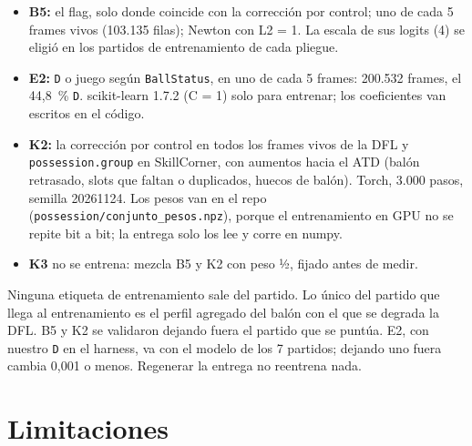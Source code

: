 \documentclass[10pt,a4paper]{article}
\newcommand{\code}[1]{\texttt{\textcolor{codigo}{#1}}}
\begin{document}
\begin{itemize}
  \item \textbf{B5:} el flag, solo donde coincide con la corrección por control; uno de cada 5 frames vivos (103.135 filas); Newton con L2 = 1. La escala de sus logits (4) se eligió en los partidos de entrenamiento de cada pliegue.
  \item \textbf{E2:} \code{D} o juego según \code{BallStatus}, en uno de cada 5 frames: 200.532 frames, el 44,8~\% \code{D}. scikit-learn 1.7.2 (C = 1) solo para entrenar; los coeficientes van escritos en el código.
  \item \textbf{K2:} la corrección por control en todos los frames vivos de la DFL y \code{possession.\allowbreak{}group} en SkillCorner, con aumentos hacia el ATD (balón retrasado, slots que faltan o duplicados, huecos de balón). Torch, 3.000 pasos, semilla 20261124. Los pesos van en el repo (\code{possession/\allowbreak{}conjunto\_\allowbreak{}pesos.\allowbreak{}npz}), porque el entrenamiento en GPU no se repite bit a bit; la entrega solo los lee y corre en numpy.
  \item \textbf{K3} no se entrena: mezcla B5 y K2 con peso ½, fijado antes de medir.
\end{itemize}

Ninguna etiqueta de entrenamiento sale del partido. Lo único del partido que llega al entrenamiento es el perfil agregado del balón con el que se degrada la DFL. B5 y K2 se validaron dejando fuera el partido que se puntúa. E2, con nuestro \code{D} en el harness, va con el modelo de los 7 partidos; dejando uno fuera cambia 0,001 o menos. Regenerar la entrega no reentrena nada.

\section{Limitaciones}\label{sec:6}
\end{document}
